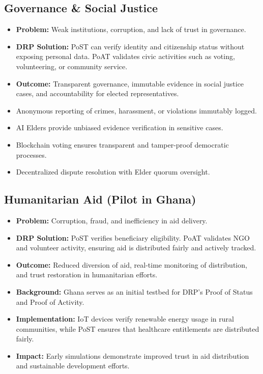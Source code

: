 \documentclass[11pt,a4paper]{article}
\begin{document}
\subsection{Governance \& Social Justice}
\begin{itemize}
    \item \textbf{Problem:} Weak institutions, corruption, and lack of trust in governance.
    \item \textbf{DRP Solution:} PoST can verify identity and citizenship status without exposing personal data. PoAT validates civic activities such as voting, volunteering, or community service.
    \item \textbf{Outcome:} Transparent governance, immutable evidence in social justice cases, and accountability for elected representatives.
    \item Anonymous reporting of crimes, harassment, or violations immutably logged.
    \item AI Elders provide unbiased evidence verification in sensitive cases.
    \item Blockchain voting ensures transparent and tamper-proof democratic processes.
    \item Decentralized dispute resolution with Elder quorum oversight.
\end{itemize}

\subsection{Humanitarian Aid (Pilot in Ghana)}
\begin{itemize}
    \item \textbf{Problem:} Corruption, fraud, and inefficiency in aid delivery.
    \item \textbf{DRP Solution:} PoST verifies beneficiary eligibility. PoAT validates NGO and volunteer activity, ensuring aid is distributed fairly and actively tracked.
    \item \textbf{Outcome:} Reduced diversion of aid, real-time monitoring of distribution, and trust restoration in humanitarian efforts.
    \item \textbf{Background:} Ghana serves as an initial testbed for DRP's Proof of Status and Proof of Activity.
    \item \textbf{Implementation:} IoT devices verify renewable energy usage in rural communities, while PoST ensures that healthcare entitlements are distributed fairly.
    \item \textbf{Impact:} Early simulations demonstrate improved trust in aid distribution and sustainable development efforts.
\end{itemize}
\end{document}
